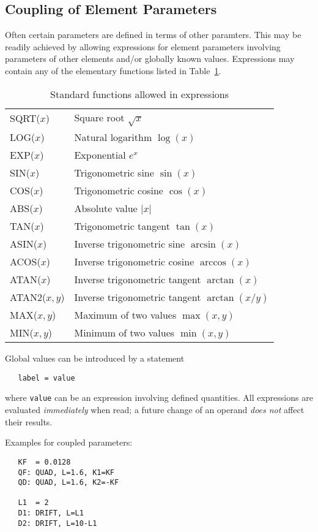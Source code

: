 \documentclass{article}
\begin{document}
\subsection{Coupling of Element Parameters}
Often certain parameters are defined in terms of other paramters.
This may be readily achieved by allowing expressions for element
parameters involving parameters of other elements and/or globally
known values.
Expressions may contain any of the elementary functions listed in
Table~\ref{functions}.
\begin{table}[htb]
  \centering
  \caption{Standard functions allowed in expressions}
  \label{functions}
  \vspace{1em}
  \begin{tabular}{|lp{}|}
    \hline
    SQRT($x$)    & Square root $\sqrt{x}$ \\
    LOG($x$)     & Natural logarithm $\log(x)$ \\
    EXP($x$)     & Exponential $e^x$ \\
    SIN($x$)     & Trigonometric sine $\sin(x)$ \\
    COS($x$)     & Trigonometric cosine $\cos(x)$ \\
    ABS($x$)     & Absolute value $|x|$ \\
    TAN($x$)     & Trigonometric tangent $\tan(x)$ \\
    ASIN($x$)    & Inverse trigonometric sine $\arcsin(x)$ \\
    ACOS($x$)    & Inverse trigonometric cosine $\arccos(x)$ \\
    ATAN($x$)    & Inverse trigonometric tangent $\arctan(x)$ \\
    ATAN2($x,y$) & Inverse trigonometric tangent $\arctan(x/y)$ \\
    MAX($x,y$)   & Maximum of two values $\max(x,y)$ \\
    MIN($x,y$)   & Minimum of two values $\min(x,y)$ \\
    \hline
  \end{tabular}
\end{table}
Global values can be introduced by a statement
\begin{verbatim}
   label = value
\end{verbatim}
where \verb'value' can be an expression involving defined quantities.
All expressions are evaluated {\em immediately} when read;
a future change of an operand {\em does not} affect their results.

Examples for coupled parameters:
\begin{verbatim}
   KF  = 0.0128
   QF: QUAD, L=1.6, K1=KF
   QD: QUAD, L=1.6, K2=-KF

   L1  = 2
   D1: DRIFT, L=L1
   D2: DRIFT, L=10-L1
\end{verbatim}
\end{document}

